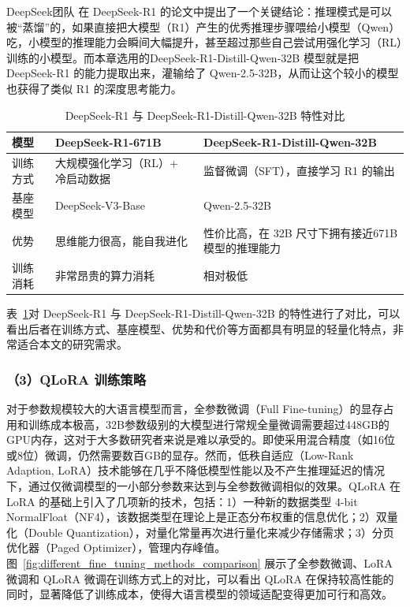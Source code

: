DeepSeek团队 在 DeepSeek-R1 的论文中提出了一个关键结论：推理模式是可以被“蒸馏”的，如果直接把大模型（R1）产生的优秀推理步骤喂给小模型（Qwen）吃，小模型的推理能力会瞬间大幅提升，甚至超过那些自己尝试用强化学习（RL）训练的小模型\cite{Guo2025DeepSeekR1}。而本章选用的DeepSeek-R1-Distill-Qwen-32B 模型就是把 DeepSeek-R1 的能力提取出来，灌输给了 Qwen-2.5-32B，从而让这个较小的模型也获得了类似 R1 的深度思考能力。

\begin{table}[!htbp]
  \centering
  \caption{DeepSeek-R1 与 DeepSeek-R1-Distill-Qwen-32B 特性对比}
  \label{tab:deepseek_r1_vs_distill_qwen32b}
  {\renewcommand{\arraystretch}{1.20}
  \small
  \setlength{\tabcolsep}{4pt}
  \begin{tabularx}{0.96\textwidth}{@{}
    >{\raggedright\arraybackslash}p{}
    >{\raggedright\arraybackslash}p{}
    >{\raggedright\arraybackslash}X
  @{}}
    \toprule
    模型 & DeepSeek-R1-671B & DeepSeek-R1-Distill-Qwen-32B \\
    \midrule
    训练方式
    & 大规模强化学习（RL）+ 冷启动数据
    & 监督微调（SFT），直接学习 R1 的输出 \\

    基座模型
    & DeepSeek-V3-Base
    & Qwen-2.5-32B \\

    优势
    & 思维能力很高，能自我进化
    & 性价比高，在 32B 尺寸下拥有接近671B模型的推理能力 \\

    训练消耗
    & 非常昂贵的算力消耗
    & 相对极低 \\
    \bottomrule
  \end{tabularx}}
\end{table}

表~\ref{tab:deepseek_r1_vs_distill_qwen32b}对 DeepSeek-R1 与 DeepSeek-R1-Distill-Qwen-32B 的特性进行了对比，可以看出后者在训练方式、基座模型、优势和代价等方面都具有明显的轻量化特点，非常适合本文的研究需求。

\subsubsection*{（3）QLoRA 训练策略}

对于参数规模较大的大语言模型而言，全参数微调（Full Fine-tuning）的显存占用和训练成本极高，32B参数级别的大模型进行常规全量微调需要超过448GB的GPU内存，这对于大多数研究者来说是难以承受的。即使采用混合精度（如16位或8位）微调，仍然需要数百GB的显存。然而，低秩自适应（Low-Rank Adaption, LoRA）技术能够在几乎不降低模型性能以及不产生推理延迟的情况下，通过仅微调模型的一小部分参数来达到与全参数微调相似的效果\cite{Hu2022LoRA}。QLoRA 在 LoRA 的基础上引入了几项新的技术，包括：1）一种新的数据类型 4-bit NormalFloat（NF4），该数据类型在理论上是正态分布权重的信息优化；2）双量化（Double Quantization），对量化常量再次进行量化来减少存储需求；3）分页优化器（Paged Optimizer），管理内存峰值\cite{Dettmers2023QLoRA}。图~\ref{fig:different_fine_tuning_methods_comparison} 展示了全参数微调、LoRA 微调和 QLoRA 微调在训练方式上的对比，可以看出 QLoRA 在保持较高性能的同时，显著降低了训练成本，使得大语言模型的领域适配变得更加可行和高效。

